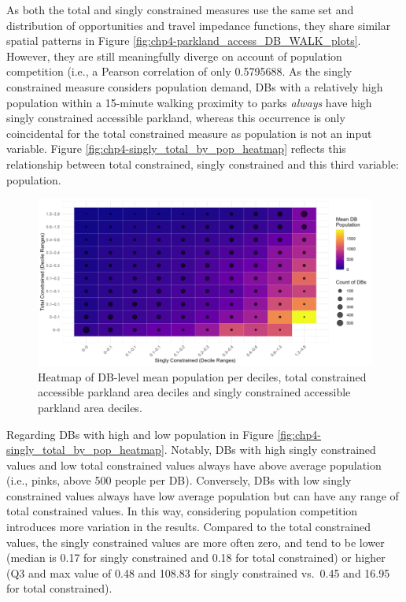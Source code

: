 \documentclass[
11pt, %
oneside, %
english, %
singlespacing, %
]{macthesis} %
\begin{document}
As both the total and singly constrained measures use the same set and distribution of opportunities and travel impedance functions, they share similar spatial patterns in Figure \ref{fig:chp4-parkland_access_DB_WALK_plots}. However, they are still meaningfully diverge on account of population competition (i.e., a Pearson correlation of only 0.5795688. As the singly constrained measure considers population demand, DBs with a relatively high population within a 15-minute walking proximity to parks \emph{always} have high singly constrained accessible parkland, whereas this occurrence is only coincidental for the total constrained measure as population is not an input variable. Figure \ref{fig:chp4-singly_total_by_pop_heatmap} reflects this relationship between total constrained, singly constrained and this third variable: population.

\begin{figure}

{\centering \includegraphics[width=6in]{./data/figures/chp4-singly_total_by_pop_heatmap} 

}

\caption{\label{fig:chp4-singly_total_by_pop_heatmap}Heatmap of DB-level mean population per deciles, total constrained accessible parkland area deciles and singly constrained accessible parkland area deciles.}\label{fig:unnamed-chunk-56}
\end{figure}

Regarding DBs with high and low population in Figure \ref{fig:chp4-singly_total_by_pop_heatmap}. Notably, DBs with high singly constrained values and low total constrained values always have above average population (i.e., pinks, above 500 people per DB). Conversely, DBs with low singly constrained values always have low average population but can have any range of total constrained values. In this way, considering population competition introduces more variation in the results. Compared to the total constrained values, the singly constrained values are more often zero, and tend to be lower (median is 0.17 for singly constrained and 0.18 for total constrained) or higher (Q3 and max value of 0.48 and 108.83 for singly constrained vs.~0.45 and 16.95 for total constrained).
\end{document}
